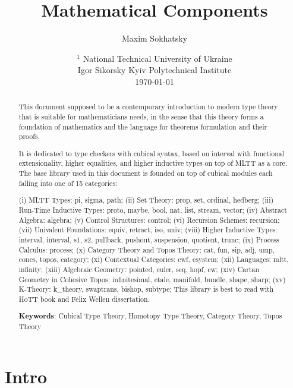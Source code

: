 \documentclass{article}
\theoremstyle{definition}
\begin{document}
\title{Mathematical Components}
\author{Maxim Sokhatsky}
\date{
    $^1$ National Technical University of Ukraine \\
    \small Igor Sikorsky Kyiv Polytechnical Institute\\
    \today
}

\maketitle

\begin{abstract}

This document supposed to be a contemporary introduction
to modern type theory that is suitable for mathematicians needs,
in the sense that this theory forms a foundation of mathematics
and the language for theorems formulation and their proofs.

It is dedicated to type checkers with cubical syntax, based on interval
with functional extensionality, higher equalities, and higher inductive types on
top of MLTT as a core. The base library used in this document
is founded on top of cubical modules each falling into one of 15 categories:

(i) MLTT Types: pi, sigma, path;
(ii) Set Theory: prop, set, ordinal, hedberg;
(iii) Run-Time Inductive Types: proto, maybe, bool, nat, list, stream, vector;
(iv) Abstract Algebra: algebra;
(v) Control Structures: control;
(vi) Recursion Schemes: recursion;
(vii) Univalent Foundations: equiv, retract, iso, univ;
(viii) Higher Inductive Types: interval, interval, s1, s2, pullback, pushout, suspension, quotient, trunc;
(ix) Process Calculus: process;
(x) Category Theory and Topos Theory: cat, fun, sip, adj, ump, cones, topos, category;
(xi) Contextual Categories: cwf, csystem;
(xii) Languages: mltt, infinity;
(xiii) Algebraic Geometry: pointed, euler, seq, hopf, cw;
(xiv) Cartan Geometry in Cohesive Topos: infinitesimal, etale, manifold, bundle, shape, sharp;
(xv) K-Theory: k\_theory, swaptrans, bishop, subtype;
This library is best to read with HoTT book and Felix Wellen dissertation.

{\bf Keywords}: Cubical Type Theory, Homotopy Type Theory, Category Theory, Topos Theory
\end{abstract}

\newpage
\tableofcontents
\newpage

\section*{Intro}
\end{document}
